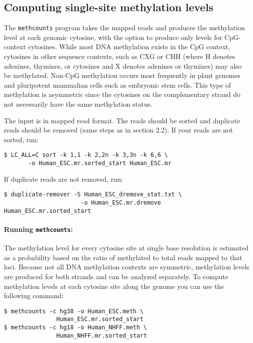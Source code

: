 \documentclass[10pt]{article}
\newcommand{\prog}[1]{\texttt{#1}}
\begin{document}
\subsection{Computing single-site methylation levels}
\label{sec:estim-methyl-freq}

The \prog{methcounts} program takes the mapped reads and produces the
methylation level at each genomic cytosine, with the option to produce
only levels for CpG-context cytosines.
While most DNA methylation exists in the CpG context, cytosines in
other sequence contexts, such as CXG or CHH (where H denotes adenines,
thymines, or cytosines and X denotes adenines or thymines) may also be
methylated. Non-CpG methylation occurs most frequently in plant genomes 
and pluripotent mammalian cells such as embryonic stem cells. This type
of methylation is asymmetric since the cytosines on the complementary 
strand do not necessarily have the same methylation status.

The input is in mapped read format. The reads should be sorted and duplicate
reads should be removed (same steps as in section 2.2). If your reads are not
sorted, run:

\begin{verbatim}
$ LC_ALL=C sort -k 1,1 -k 2,2n -k 3,3n -k 6,6 \
       -o Human_ESC.mr.sorted_start Human_ESC.mr
\end{verbatim}
If duplicate reads are not removed, run:

\begin{verbatim}
$ duplicate-remover -S Human_ESC_dremove_stat.txt \
                      -o Human_ESC.mr.dremove Human_ESC.mr.sorted_start
\end{verbatim}

\paragraph{Running \prog{methcounts}:}
The methylation level for every cytosine site at single base resolution
is estimated as a probability based on the ratio of methylated to total
reads mapped to that loci. Because not all DNA methylation contexts are
symmetric, methylation levels are produced for both strands and can be
analyzed separately. To compute methylation levels at each
cytosine site along the genome you can use the following command:

\begin{verbatim}
$ methcounts -c hg38 -o Human_ESC.meth \
               Human_ESC.mr.sorted_start
$ methcounts -c hg18 -o Human_NHFF.meth \
               Human_NHFF.mr.sorted_start
\end{verbatim}
\end{document}
